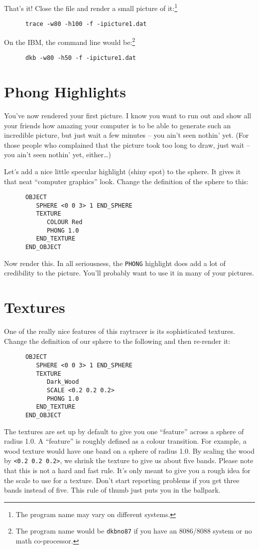 That's it!  Close the file and render a small picture of
it:\footnote{The program name may vary on different systems.}
\begin{verbatim}
      trace -w80 -h100 -f -ipicture1.dat
\end{verbatim}
On the IBM, the command line would be:\footnote{The program name would
be {\tt dkbno87} if you have an 8086/8088 system or no math co-processor.}
\begin{verbatim}
      dkb -w80 -h50 -f -ipicture1.dat
\end{verbatim}

\section{Phong Highlights}

You've now rendered your first picture.  I know you want to run out and show
all your friends how amazing your computer is to be able to generate such an
incredible picture, but just wait a few minutes -- you ain't seen nothin' yet.
(For those people who complained that the picture took too long to draw, just
wait -- you ain't seen nothin' yet, either\ldots)

Let's add a nice little specular highlight
(shiny spot) to the sphere.  It
gives it that neat ``computer graphics'' look.  Change the definition of the
sphere to this:
\begin{verbatim}
      OBJECT
         SPHERE <0 0 3> 1 END_SPHERE
         TEXTURE
            COLOUR Red
            PHONG 1.0
         END_TEXTURE
      END_OBJECT
\end{verbatim}
Now render this.  In all seriousness, the {\tt PHONG} highlight does
add a lot of credibility to the picture.  You'll probably want to use
it in many of your pictures.

\section{Textures}

One of the really nice features of this raytracer is its sophisticated
textures.  Change the definition of our sphere to the following and then
re-render it:
\begin{verbatim}
      OBJECT
         SPHERE <0 0 3> 1 END_SPHERE
         TEXTURE
            Dark_Wood
            SCALE <0.2 0.2 0.2>
            PHONG 1.0
         END_TEXTURE
      END_OBJECT
\end{verbatim}
The textures are set up by default to give you one ``feature'' across
a sphere of radius 1.0.  A ``feature'' is roughly defined as a colour
transition.  For example, a wood texture would have one band on a
sphere of radius 1.0.  By scaling the wood by {\tt <0.2 0.2 0.2>}, we
shrink the texture to give us about five bands. Please note that this
is not a hard and fast rule.  It's only meant to give you a rough idea
for the scale to use for a texture.  Don't start reporting problems if
you get three bands instead of five.  This rule of thumb just puts you
in the ballpark.

